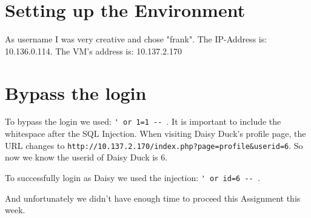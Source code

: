 \section{Setting up the Environment}

As username I was very creative and chose "frank". The IP-Address is: 10.136.0.114. The VM's address is: 10.137.2.170

\section{Bypass the login}

To bypass the login we used: \verb|' or 1=1 -- |. It is important to include the whitespace after the SQL Injection. When visiting Daisy Duck's profile page, the URL changes to \verb|http://10.137.2.170/index.php?page=profile&userid=6|. So now we know the userid of Daisy Duck is 6.

To successfully login as Daisy we used the injection: \verb|' or id=6 -- |.


And unfortunately we didn't have enough time to proceed this Assignment this week.






